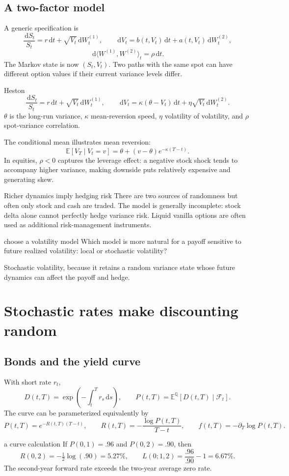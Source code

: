 \documentclass[10pt]{article}
\newcommand{\E}{\mathbb E}\newcommand{\Q}{\mathbb Q}\newcommand{\cF}{\mathcal F}
\newcommand{\dd}{\,\mathrm d}\newcommand{\Var}{\operatorname{Var}}
\theoremstyle{definition}\newtheorem{definition}{Definition}[section]
\begin{document}
\subsection{A two-factor model}
A generic specification is
\[
\frac{\dd S_t}{S_t}=r\dd t+\sqrt{V_t}\dd W_t^{(1)},\qquad
\dd V_t=b(t,V_t)\dd t+a(t,V_t)\dd W_t^{(2)},
\]
\[
\dd\langle W^{(1)},W^{(2)}\rangle_t=\rho\dd t.
\]
The Markov state is now \((S_t,V_t)\). Two paths with the same spot can have
different option values if their current variance levels differ.

\begin{boardexample}{Heston}
\[
\frac{\dd S_t}{S_t}=r\dd t+\sqrt{V_t}\dd W_t^{(1)},\qquad
\dd V_t=\kappa(\theta-V_t)\dd t+\eta\sqrt{V_t}\dd W_t^{(2)}.
\]
\(\theta\) is the long-run variance, \(\kappa\) mean-reversion speed,
\(\eta\) volatility of volatility, and \(\rho\) spot-variance correlation.
\end{boardexample}

The conditional mean illustrates mean reversion:
\[
\E[V_T\mid V_t=v]=\theta+(v-\theta)e^{-\kappa(T-t)}.
\]
In equities, \(\rho<0\) captures the leverage effect: a negative stock
shock tends to accompany higher variance, making downside puts relatively
expensive and generating skew.

\begin{warningbox}{Richer dynamics imply hedging risk}
There are two sources of randomness but often only stock and cash are
traded. The model is generally incomplete: stock delta alone cannot
perfectly hedge variance risk. Liquid vanilla options are often used as
additional risk-management instruments.
\end{warningbox}
\begin{studentexercise}{choose a volatility model}
Which model is more natural for a payoff sensitive to future realized
volatility: local or stochastic volatility?
\end{studentexercise}
\begin{shortsolution}
Stochastic volatility, because it retains a random variance state whose
future dynamics can affect the payoff and hedge.
\end{shortsolution}

\section{Stochastic rates make discounting random}
\subsection{Bonds and the yield curve}
With short rate \(r_t\),
\[
D(t,T)=\exp\left(-\int_t^T r_s\dd s\right),\qquad
P(t,T)=\E^\Q[D(t,T)\mid\cF_t].
\]
The curve can be parameterized equivalently by
\[
P(t,T)=e^{-R(t,T)(T-t)},\qquad
R(t,T)=-\frac{\log P(t,T)}{T-t},\qquad
f(t,T)=-\partial_T\log P(t,T).
\]
\begin{boardexample}{a curve calculation}
If \(P(0,1)=.96\) and \(P(0,2)=.90\), then
\[
R(0,2)=-\tfrac12\log(.90)=5.27\%,
\qquad L(0;1,2)=\frac{.96}{.90}-1=6.67\%.
\]
The second-year forward rate exceeds the two-year average zero rate.
\end{boardexample}
\end{document}
